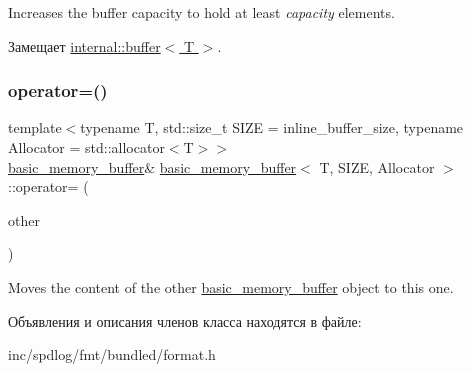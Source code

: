 Increases the buffer capacity to hold at least {\itshape capacity} elements. 

Замещает \hyperlink{classinternal_1_1buffer_a38f53be20945474be4f60b58b9b4cc54}{internal\+::buffer$<$ T $>$}.

\mbox{\label{classbasic__memory__buffer_a89e2e5da9bee8af9c487b4493c4d6327}} 
\subsubsection{\texorpdfstring{operator=()}{operator=()}}
{\footnotesize\ttfamily template$<$typename T, std\+::size\+\_\+t S\+I\+ZE = inline\+\_\+buffer\+\_\+size, typename Allocator = std\+::allocator$<$\+T$>$$>$ \\
\hyperlink{classbasic__memory__buffer}{basic\+\_\+memory\+\_\+buffer}\& \hyperlink{classbasic__memory__buffer}{basic\+\_\+memory\+\_\+buffer}$<$ T, S\+I\+ZE, Allocator $>$\+::operator= (\begin{DoxyParamCaption}\item[{\hyperlink{classbasic__memory__buffer}{basic\+\_\+memory\+\_\+buffer}$<$ T, S\+I\+ZE, Allocator $>$ \&\&}]{other }\end{DoxyParamCaption})\hspace{0.3cm}{\ttfamily [inline]}}

Moves the content of the other {\ttfamily \hyperlink{classbasic__memory__buffer}{basic\+\_\+memory\+\_\+buffer}} object to this one.  

Объявления и описания членов класса находятся в файле\+:\begin{DoxyCompactItemize}
\item 
inc/spdlog/fmt/bundled/format.\+h\end{DoxyCompactItemize}
